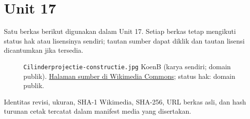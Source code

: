 \section*{Unit 17}
Satu berkas berikut digunakan dalam Unit 17. Setiap berkas tetap mengikuti status hak atau lisensinya sendiri; tautan sumber dapat diklik dan tautan lisensi dicantumkan jika tersedia.
\begin{description}
\item[]\texttt{Cilinderprojectie-constructie.jpg}
KoenB (karya sendiri; domain publik).
\href{https://commons.wikimedia.org/wiki/File:Cilinderprojectie-constructie.jpg}{Halaman sumber di Wikimedia Commons}; status hak: domain publik.
\end{description}
Identitas revisi, ukuran, SHA-1 Wikimedia, SHA-256, URL berkas asli, dan hash turunan cetak tercatat dalam manifest media yang disertakan.

